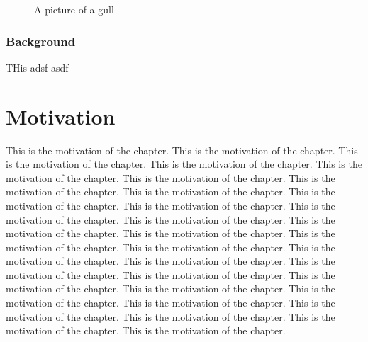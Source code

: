 \documentclass{nithreport}
\begin{document}
\begin{figure}
  \caption{A picture of a gull}
\end{figure}

\subsection{Background}
THis adsf asdf 

\chapter{Motivation}
This is the motivation of the chapter. This is the motivation of the chapter. This is the motivation of the chapter. This is the motivation of the chapter. This is the motivation of the chapter. This is the motivation of the chapter. This is the motivation of the chapter. This is the motivation of the chapter. This is the motivation of the chapter. This is the motivation of the chapter. This is the motivation of the chapter. This is the motivation of the chapter. This is the motivation of the chapter. This is the motivation of the chapter. This is the motivation of the chapter. This is the motivation of the chapter. This is the motivation of the chapter. This is the motivation of the chapter. This is the motivation of the chapter. This is the motivation of the chapter. This is the motivation of the chapter. This is the motivation of the chapter. This is the motivation of the chapter. This is the motivation of the chapter. This is the motivation of the chapter. This is the motivation of the chapter. This is the motivation of the chapter. This is the motivation of the chapter. 
\end{document}
